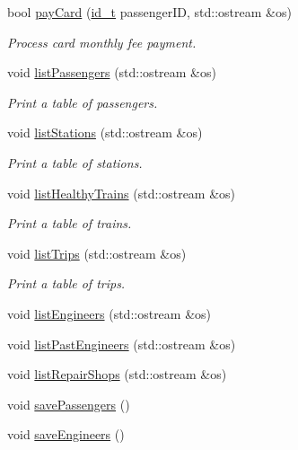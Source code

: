 \begin{DoxyCompactItemize}
bool \mbox{\hyperlink{classSystem_a93e28750e7677d09a7eb2acfc2590209}{pay\+Card}} (\mbox{\hyperlink{project__utils_8h_a8f3a969054ad2200720b96e7e23dd4e1}{id\+\_\+t}} passenger\+ID, std\+::ostream \&os)
\begin{DoxyCompactList}\small\item\em Process card monthly fee payment. \end{DoxyCompactList}\item 
void \mbox{\hyperlink{classSystem_a23c0b01d0e84fa4665ce85203ce6747b}{list\+Passengers}} (std\+::ostream \&os)
\begin{DoxyCompactList}\small\item\em Print a table of passengers. \end{DoxyCompactList}\item 
void \mbox{\hyperlink{classSystem_a06041827a7b47ad06eee9d121e42590c}{list\+Stations}} (std\+::ostream \&os)
\begin{DoxyCompactList}\small\item\em Print a table of stations. \end{DoxyCompactList}\item 
void \mbox{\hyperlink{classSystem_a54cf2411ea0b4c47a30f9e44442b59a9}{list\+Healthy\+Trains}} (std\+::ostream \&os)
\begin{DoxyCompactList}\small\item\em Print a table of trains. \end{DoxyCompactList}\item 
void \mbox{\hyperlink{classSystem_af11f201f6417c2658f35238d98c6f032}{list\+Trips}} (std\+::ostream \&os)
\begin{DoxyCompactList}\small\item\em Print a table of trips. \end{DoxyCompactList}\item 
void \mbox{\hyperlink{classSystem_a833ba14791db12a0e6f45b17bbeef068}{list\+Engineers}} (std\+::ostream \&os)
\item 
void \mbox{\hyperlink{classSystem_afd19a30636955896bc6dd59d9a4ca20e}{list\+Past\+Engineers}} (std\+::ostream \&os)
\item 
void \mbox{\hyperlink{classSystem_ac6e7530d7bde96b46e6db061ed139096}{list\+Repair\+Shops}} (std\+::ostream \&os)
\item 
void \mbox{\hyperlink{classSystem_a43da2cea53bae53723d572855cfbe817}{save\+Passengers}} ()
\item 
void \mbox{\hyperlink{classSystem_a8cfeb93474f802f30212fad659b10937}{save\+Engineers}} ()

\end{DoxyCompactItemize}
